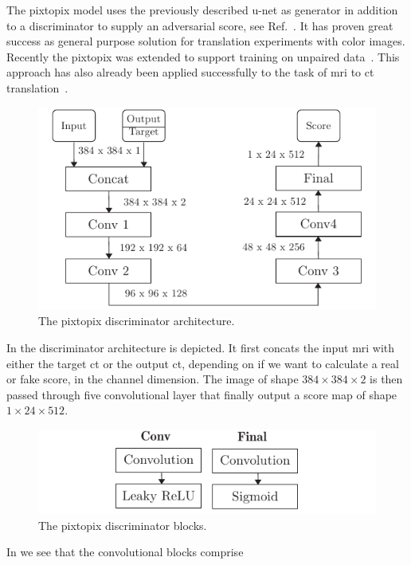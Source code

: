 The pixtopix model uses the previously described u-net as generator in
addition to a discriminator to supply an adversarial score, see
Ref.~\cite{Isola16}. It has proven great success as general purpose solution
for translation experiments with color images. Recently the pixtopix was
extended to support training on unpaired data~\cite{Zhu2017}. This approach
has also already been applied successfully to the task of \gls{mri} to
\gls{ct} translation~\cite{Wolterink17}.
\begin{figure}[h]
  \centering
  \includegraphics[width=\linewidth]{figure/pixtopix-disc.pdf}
  \caption{The pixtopix discriminator architecture.
	}\label{fig:pixtopix:disc}
\end{figure}
In  the discriminator architecture is depicted. It
first concats the input \gls{mri} with either the target \gls{ct} or the
output \gls{ct}, depending on if we want to calculate a real or fake score,
in the channel dimension. The image of shape $384\times384\times2$ is then
passed through five convolutional layer that finally output a score map of
shape $1\times24\times512$.
\begin{figure}[h]
  \centering
  \includegraphics[width=\linewidth]{figure/pixtopix-blocks.pdf}
  \caption{The pixtopix discriminator blocks.
	}\label{fig:pixtopix:blocks}
\end{figure}
In  we see that the convolutional blocks comprise
